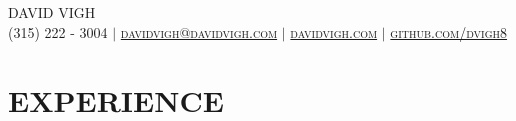 \documentclass[letterpaper,11pt]{article}
\begin{document}
\thispagestyle{fancy}
\fancyhf{} %
\fancyheadoffset[R]{-0.1cm}

\begin{center}
    \Huge \scshape DAVID VIGH \\ \vspace{1pt}
    \small (315) 222 - 3004 $|$ 
    \href{mailto:davidvigh@davidvigh.com}{davidvigh@davidvigh.com} $|$ 
    \href{https://www.davidvigh.com/}{davidvigh.com} $|$
    \href{https://github.com/dvigh8}{github.com/dvigh8} \\ \vspace{-5pt}
\end{center}


\section{\textbf{EXPERIENCE}}
\end{document}
